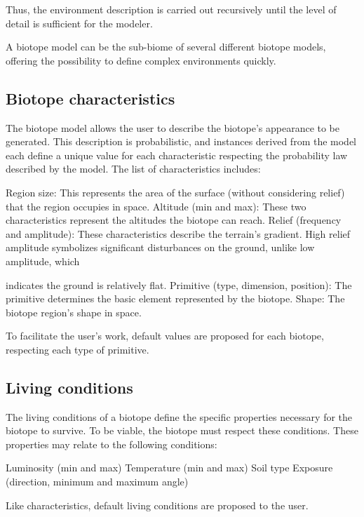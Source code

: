 Thus, the environment description is carried out recursively until the level of detail is sufficient for the modeler.

A biotope model can be the sub-biome of several different biotope models, offering the possibility to define complex environments quickly.

\subsection{Biotope characteristics}
The biotope model allows the user to describe the biotope's appearance to be generated. This description is probabilistic, and instances derived from the model each define a unique value for each characteristic respecting the probability law described by the model. The list of characteristics includes:
\begin{Itemize}
	\Item{} Region size: This represents the area of the surface (without considering relief) that the region occupies in space.
	\Item{} Altitude (min and max): These two characteristics represent the altitudes the biotope can reach.
	\Item{} Relief (frequency and amplitude): These characteristics describe the terrain's gradient. High relief amplitude symbolizes significant disturbances on the ground, unlike low amplitude, which
	
	indicates the ground is relatively flat.
	\Item{} Primitive (type, dimension, position): The primitive determines the basic element represented by the biotope.
	\Item{} Shape: The biotope region's shape in space.
\end{Itemize}

To facilitate the user's work, default values are proposed for each biotope, respecting each type of primitive.

\subsection{Living conditions}
The living conditions of a biotope define the specific properties necessary for the biotope to survive. To be viable, the biotope must respect these conditions. These properties may relate to the following conditions:
\begin{Itemize}
	\Item{} Luminosity (min and max)
	\Item{} Temperature (min and max)
	\Item{} Soil type
	\Item{} Exposure (direction, minimum and maximum angle)
\end{Itemize}

Like characteristics, default living conditions are proposed to the user.

